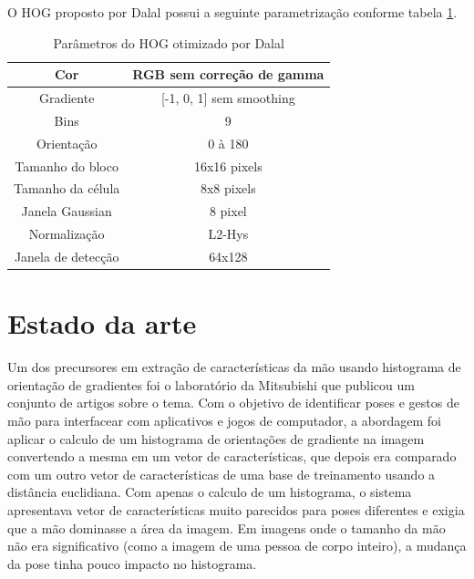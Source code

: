 O HOG proposto por Dalal \cite{dalal} possui a seguinte parametrização conforme tabela \ref{table:dlal_hog}.

\begin{table}[!h]
\centering
\begin{tabular}{|c|c|}
\hline Cor & RGB sem correção de gamma \\ 
\hline Gradiente & [-1, 0, 1] sem smoothing \\ 
\hline Bins & 9 \\
\hline Orientação & 0 à 180 \\
\hline Tamanho do bloco & 16x16 pixels \\
\hline Tamanho da célula & 8x8 pixels \\
\hline Janela Gaussian & 8 pixel \\
\hline Normalização & L2-Hys \\
\hline Janela de detecção & 64x128 \\
\hline 
\end{tabular} 
\caption{Parâmetros do HOG otimizado por Dalal}
\label{table:dlal_hog}
\end{table}

\section{Estado da arte}

Um dos precursores em extração de características da mão usando histograma de orientação de gradientes foi o laboratório da Mitsubishi que publicou um conjunto de artigos \cite{freeman1995orientation, freeman1996computer} sobre o tema. Com o objetivo de identificar poses e gestos de mão para interfacear com aplicativos e jogos de computador, a abordagem foi aplicar o calculo de um histograma de orientações de gradiente na imagem convertendo a mesma em um vetor de características, que depois era comparado com um outro vetor de características de uma base de treinamento usando a distância euclidiana. Com apenas o calculo de um histograma, o sistema apresentava vetor de características muito parecidos para poses diferentes e exigia que a mão dominasse a área da imagem. Em imagens onde o tamanho da mão não era significativo (como a imagem de uma pessoa de corpo inteiro), a mudança da pose tinha pouco impacto no histograma.


